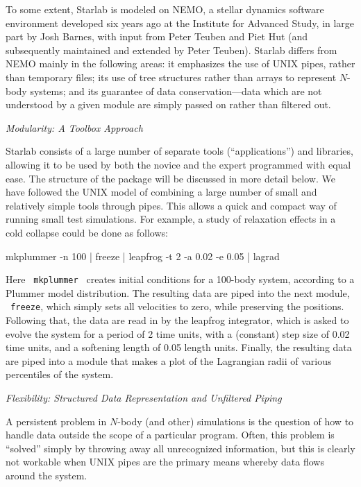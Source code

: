 To some extent, Starlab is modeled on NEMO, a stellar dynamics
software environment developed six years ago at the Institute for
Advanced Study, in large part by Josh Barnes, with input from Peter
Teuben and Piet Hut (and subsequently maintained and extended by Peter
Teuben).  Starlab differs from NEMO mainly in the following areas: it
emphasizes the use of UNIX pipes, rather than temporary files; its use
of tree structures rather than arrays to represent $N$-body systems;
and its guarantee of data conservation---data which are not understood
by a given module are simply passed on rather than filtered out.

\bigskip\noindent
{\it Modularity: A Toolbox Approach}
\medskip

Starlab consists of a large number of separate tools
(``applications'') and libraries, allowing it to be used by both the
novice and the expert programmed with equal ease.  The structure of
the package will be discussed in more detail below.  We have followed
the UNIX model of combining a large number of small and relatively
simple tools through pipes.  This allows a quick and compact way of
running small test simulations.  For example, a study of relaxation
effects in a cold collapse could be done as follows:

{\codes
\quad mkplummer -n 100 | freeze | leapfrog -t 2 -a 0.02 -e 0.05 | lagrad
}
\medskip

Here {\tt \ mkplummer\ } creates initial conditions for a 100-body
system, according to a Plummer model distribution.  The resulting data
are piped into the next module, {\tt \ freeze}, which simply sets all
velocities to zero, while preserving the positions.  Following that,
the data are read in by the leapfrog integrator, which is asked to
evolve the system for a period of 2 time units, with a (constant) step
size of 0.02 time units, and a softening length of 0.05 length units.
Finally, the resulting data are piped into a module that makes a plot
of the Lagrangian radii of various percentiles of the system.

\bigskip\noindent
{\it Flexibility: Structured Data Representation and Unfiltered Piping}
\medskip

A persistent problem in $N$-body (and other) simulations is the question
of how to handle data outside the scope of a particular program.
Often, this problem is ``solved'' simply by throwing away all
unrecognized information, but this is clearly not workable when UNIX
pipes are the primary means whereby data flows around the system.

